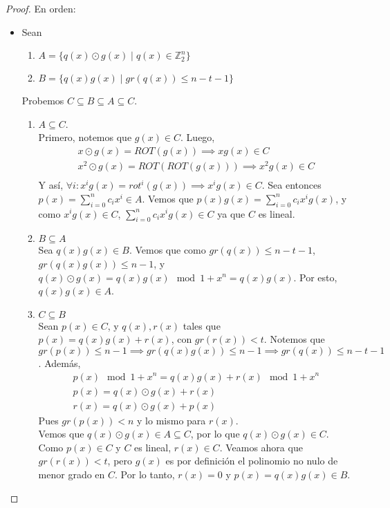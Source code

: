 \begin{proof}
En orden:
\begin{itemize}
    \item Sean
    \begin{enumerate}
        \item $A = \{ q(x) \odot g(x) \mid q(x) \in \mathbb{Z}_2^n\}$ 
        \item $B = \{ q(x)g(x) \mid gr(q(x)) \le n - t - 1 \}$ 
    \end{enumerate}
    Probemos $C \subseteq B \subseteq A \subseteq C$.
    \begin{enumerate}
        \item $A \subseteq C$.\\
        Primero, notemos que $g(x) \in C$. Luego,
        \begin{align}
            x \odot g(x) = ROT(g(x)) \implies x g(x) \in C\\
            x^2 \odot g(x) = ROT(ROT(g(x))) \implies x^2 g(x) \in C\\
        \end{align}
        Y así, $\forall i : x^ig(x) = rot^i(g(x)) \implies x^i g(x) \in C$. Sea entonces $p(x) = \sum_{i=0}^n c_ix^i \in A$. Vemos que $p(x)g(x) = \sum_{i=0}^n c_ix^ig(x)$, y como $x^ig(x) \in C$, $\sum_{i=0}^n c_ix^ig(x) \in C$ ya que $C$ es lineal.
        \item $B \subseteq A$\\
        Sea $q(x)g(x) \in B$. Vemos que como $gr(q(x)) \le n - t - 1$, $gr(q(x)g(x)) \le n - 1$, y $q(x) \odot g(x) = q(x)g(x) \mod 1+x^n = q(x)g(x)$. Por esto, $q(x)g(x) \in A$.
        \item $C \subseteq B$\\
        Sean $p(x) \in C$, y $q(x), r(x)$ tales que $p(x) = q(x)g(x) + r(x)$, con $gr(r(x)) < t$. Notemos que $gr(p(x)) \le n - 1 \implies gr(q(x)g(x)) \le n - 1 \implies gr(q(x)) \le n - t -1$. Además,
        \begin{align}
            p(x) \mod{1+x^n} = q(x)g(x) + r(x) \mod{1+x^n}\\
            p(x) = q(x) \odot g(x) + r(x)\\
            r(x) = q(x) \odot g(x) + p(x)
        \end{align}
        Pues $gr(p(x)) < n$ y lo mismo para $r(x)$.\\
        Vemos que $q(x) \odot g(x) \in A \subseteq C$, por lo que $q(x) \odot g(x) \in C$. Como $p(x) \in C$ y $C$ es lineal, $r(x) \in C$. Veamos ahora que $gr(r(x)) < t$, pero $g(x)$ es por definición el polinomio no nulo de menor grado en $C$. Por lo tanto, $r(x) = 0$ y $p(x) = q(x)g(x) \in B$.

\end{enumerate}
\end{itemize}
\end{proof}
